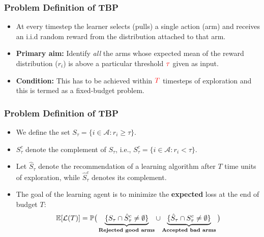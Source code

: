 \begin{frame}
\frametitle{Problem Definition of TBP}
\begin{itemize}
\item<1-> At every timestep the learner selects (pulls) a single action (arm) and receives an i.i.d random reward from the distribution attached to that arm.
\item<2-> \textbf{Primary aim:} Identify \textit{all} the arms whose expected mean of the reward distribution ($r_i$) is above a particular threshold $\mathbin{\textcolor{red}{\tau}}$ given as input.
\item<3-> \textbf{Condition:} This has to be achieved within $\mathbin{\textcolor{red}{T}}$ timesteps of exploration and this is termed as a fixed-budget problem.
\end{itemize}
\end{frame}

\begin{frame}
\frametitle{Problem Definition of TBP}
\begin{itemize}
\item<1-> We define the set $S_{\tau}=\lbrace i\in \mathcal{A}: r_{i}\geq \tau \rbrace$. 
\item<2-> $S_\tau^c$ denote the complement of $S_\tau$, i.e.,  $S_{\tau}^{c}=\lbrace i\in \mathcal{A}: r_{i} < \tau \rbrace$. 
\item<3-> Let $\hat{S}_{\tau}$ denote the recommendation of a learning algorithm after $T$ time units of exploration, while $\hat{S}_{\tau}^c$ denotes its complement.
\item<4-> The goal of the learning agent is to minimize the \textbf{expected} loss at the end of budget $T$:
\begin{align*}
\mathbb{E}[\mathcal{L}(T)] &= \mathbb{P}\big(\underbrace{\lbrace S_{\tau}\cap \hat{S}_{\tau}^{c} \neq \emptyset \rbrace}_{\textbf{Rejected good arms}}  \cup   \underbrace{\lbrace \hat{S}_{\tau}\cap S_{\tau}^{c} \neq \emptyset\rbrace}_{\textbf{Accepted bad arms}}\big) \\
\end{align*}
\end{itemize}
\end{frame}

